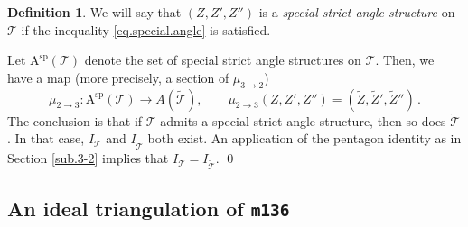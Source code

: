 \documentclass[12pt]{amsart}
\theoremstyle{definition}
\newtheorem{definition}[theorem]{Definition}
\def\calT{\mathcal T}
\newcommand{\wt}{\widetilde}
\numberwithin{equation}{section}
\begin{document}
\begin{definition}
\label{def.special.index}
We will say that $(Z,Z',Z'')$ is a {\em special strict angle structure}
on $\calT$ if the inequality \eqref{eq.special.angle} is satisfied.
\end{definition}
Let $\mathrm{A}^{\mathrm{sp}}(\calT)$ denote the set of special strict
angle structures on $\calT$. Then, we have a map (more precisely, a section of 
$\mu_{3 \to 2}$)
$$
\mu_{2\to 3} \colon \mathrm{A}^{\mathrm{sp}}(\calT) \to A(\wt{\calT}),
\qquad
\mu_{2\to 3}(Z,Z',Z'')=(\wt Z,\wt Z',\wt Z'') \,.
$$
The conclusion is that if $\calT$ admits a special strict angle structure,
then so does $\wt{\calT}$. In that case, $I_{\calT}$ and $I_{\wt{\calT}}$ both
exist. An application of the pentagon identity as in Section \ref{sub.3-2}
implies that $I_{\calT}=I_{\wt{\calT}}$.
\qed

\subsection{An ideal triangulation of {\tt m136}}
\label{sub.m136}
\end{document}
